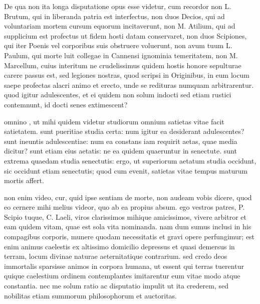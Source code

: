  De qua non ita longa disputatione opus esse videtur, cum recordor non L. Brutum, qui in liberanda patria est interfectus, non duos Decios, qui ad voluntariam mortem cursum equorum incitaverunt, non M. Atilium, qui ad supplicium est profectus ut fidem hosti datam conservaret, non duos Scipiones, qui iter Poenis vel corporibus suis obstruere voluerunt, non avum tuum L. Paulum, qui morte luit collegae in Cannensi ignominia temeritatem, non M. Marcellum, cuius interitum ne crudelissimus quidem hostis honore sepulturae carere passus est, sed legiones nostras, quod scripsi in Originibus, in eum locum saepe profectas alacri animo et erecto, unde se redituras numquam arbitrarentur. quod igitur adulescentes, et ei quidem non solum indocti sed etiam rustici contemnunt, id docti senes extimescent?

 omnino , ut mihi quidem videtur studiorum omnium satietas vitae facit satietatem. sunt pueritiae studia certa: num igitur ea desiderant adulescentes? sunt ineuntis adulescentiae: num ea constans iam requirit aetas, quae media dicitur? sunt etiam eius aetatis: ne ea quidem quaeruntur in senectute. sunt extrema quaedam studia senectutis: ergo, ut superiorum aetatum studia occidunt, sic occidunt etiam senectutis; quod cum evenit, satietas vitae tempus maturum mortis affert.

 non enim video, cur, quid ipse sentiam de morte, non audeam vobis dicere, quod eo cernere mihi melius videor, quo ab ea propius absum. ego vestros patres, P. Scipio tuque, C. Laeli, viros clarissimos mihique amicissimos, vivere arbitror et eam quidem vitam, quae est sola vita nominanda. nam dum sumus inclusi in his compagibus corporis, munere quodam necessitatis et gravi opere perfungimur; est enim animus caelestis ex altissimo domicilio depressus et quasi demersus in terram, locum divinae naturae aeternitatique contrarium. sed credo deos immortalis sparsisse animos in corpora humana, ut essent qui terras tuerentur quique caelestium ordinem contemplantes imitarentur eum vitae modo atque constantia. nec me solum ratio ac disputatio impulit ut ita crederem, sed nobilitas etiam summorum philosophorum et auctoritas.

